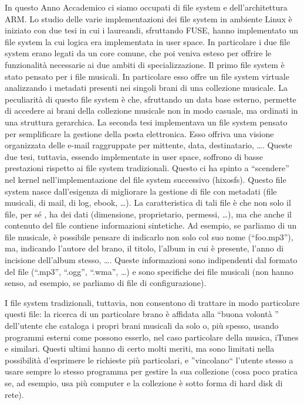 \documentclass[a4paper,12pt]{article}
\newcommand{\ua }{\`{u} }
\renewcommand{\aa }{\`{a} }
\newcommand{\ea }{\`{e} }
\newcommand{\egrave }{\'{e} }
\begin{document}
In questo Anno Accademico ci siamo occupati di file system e dell'architettura ARM.
Lo studio delle varie implementazioni dei file system in ambiente Linux è iniziato con due tesi in cui i laureandi, sfruttando FUSE, hanno implementato un file system la cui logica era implementata in user space.
In particolare i due file system erano legati da un core comune, che poi veniva esteso per offrire le funzionalità necessarie ai due ambiti di specializzazione.
Il primo file system \ea stato pensato per i file musicali.
In particolare esso offre un file system virtuale analizzando i metadati presenti nei singoli brani di una collezione musicale.
La peculiarità di questo file system è che, sfruttando un data base esterno, permette di accedere ai brani della collezione musicale non in modo casuale, ma ordinati in una struttura gerarchica.
La seconda tesi implementava un file system pensato per semplificare la gestione della posta elettronica.
Esso offriva una visione organizzata delle e-mail raggruppate per mittente, data, destinatario, \dots.
Queste due tesi, tuttavia, essendo implementate in user space, soffrono di basse prestazioni rispetto ai file system tradizionali.
Questo ci ha spinto a ``scendere'' nel kernel nell'implementazione del file system successivo (hixosfs).
Questo file system nasce dall'esigenza di migliorare la gestione di file con metadati (file musicali, di mail, di log, ebook, \dots).
La caratteristica di tali file \ea che non solo il file, per s\egrave, ha dei dati (dimensione, proprietario, permessi, \dots), ma che anche il contenuto del file contiene informazioni sintetiche.
Ad esempio, se parliamo di un file musicale, \ea possibile pensare di indicarlo non solo col suo nome (``foo.mp3''), ma, indicando l'autore del brano, il titolo, l'album in cui \ea presente, l'anno di incisione dell'album stesso, \dots.
Queste informazioni sono indipendenti dal formato del file (``.mp3'', ``.ogg'', ``.wma'', \dots) e sono specifiche dei file musicali (non hanno senso, ad esempio, se parliamo di file di configurazione).

I file system tradizionali, tuttavia, non consentono di trattare in modo particolare questi file: la ricerca di un particolare brano \ea affidata alla ``buona volont\aa'' dell'utente che cataloga i propri brani musicali da solo o, pi\ua spesso, usando programmi esterni come possono esserlo, nel caso particolare della musica, iTunes e similari.
Questi ultimi hanno di certo molti meriti, ma sono limitati nella possibilit\aa d'esprimere le richieste pi\ua particolari, e ''vincolano`` l'utente stesso a usare sempre lo stesso programma per gestire la sua collezione (cosa poco pratica se, ad esempio, usa più computer e la collezione \ea sotto forma di hard disk di rete).
\end{document}
